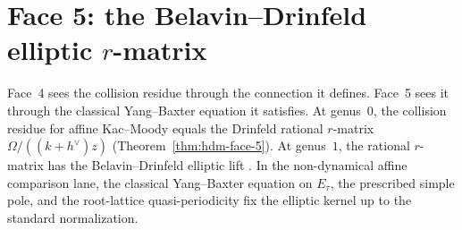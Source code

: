 
\section{Face 5: the Belavin--Drinfeld elliptic $r$-matrix}
\label{sec:g1sf-face-5}

Face~4 sees the collision residue through the connection it defines.
Face~5 sees it through the classical Yang--Baxter equation it
satisfies. At genus~$0$, the collision residue for affine Kac--Moody
equals the Drinfeld rational $r$-matrix
$\Omega/((k+h^\vee)z)$
(Theorem~\ref{thm:hdm-face-5}). At genus~$1$, the rational
$r$-matrix has the Belavin--Drinfeld elliptic lift
\cite{Belavin81,BelavinDrinfeld82}. In the non-dynamical affine
comparison lane, the classical Yang--Baxter equation on $E_\tau$,
the prescribed simple pole, and the root-lattice quasi-periodicity fix
the elliptic kernel up to the standard normalization.

